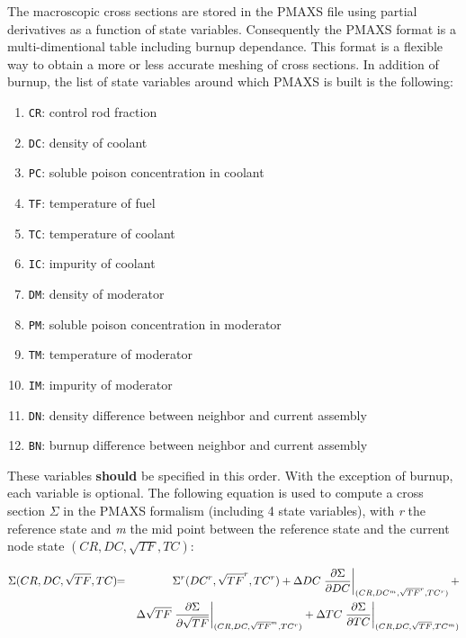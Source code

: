 \vskip 0.08cm

The macroscopic cross sections are stored in the PMAXS file using partial derivatives as a function of state variables. Consequently the PMAXS format is  a multi-dimentional table including burnup dependance. This format is a flexible way to obtain a more or less accurate meshing of cross sections. In addition of burnup, the list of state variables around which PMAXS is built is the following:

\begin{enumerate}
\item {\tt CR}: control rod fraction
\item {\tt DC}: density of coolant
\item {\tt PC}: soluble poison concentration in coolant
\item {\tt TF}: temperature of fuel
\item {\tt TC}: temperature of coolant
\item {\tt IC}: impurity of coolant
\item {\tt DM}: density of moderator
\item {\tt PM}: soluble poison concentration in moderator
\item {\tt TM}: temperature of moderator
\item {\tt IM}: impurity of moderator
\item {\tt DN}: density difference between neighbor and current assembly
\item {\tt BN}: burnup difference between neighbor and current assembly
\end{enumerate}

These variables \textbf{should} be specified in this order. With the exception of burnup, each variable is optional. The following equation is used to compute a cross section $\Sigma$ in the PMAXS formalism (including 4 state variables), with \textit{r} the reference state and  \textit{m} the mid point between the reference state and the current node state $( CR, DC,\sqrt{TF},TC )$:

\begin{eqnarray*}
\Sigma ( CR, DC,\sqrt{TF},TC )\negthinspace\negthinspace&=& \negthinspace\negthinspace\Sigma^{r} ( DC^{r},\sqrt{TF}^{r},TC^{r} ) +
\Delta DC
 \left. {\partial \Sigma\over \partial DC} \right|_{(CR, DC^{m} ,\sqrt{TF}^{r},TC^{r})} + 
 \\
&~&\Delta \sqrt{TF}
 \left. {\partial \Sigma\over \partial \sqrt{TF}} \right|_{(CR, DC ,\sqrt{TF}^{m},TC^{r})}+
  \Delta TC
 \left. {\partial \Sigma\over \partial TC} \right|_{(CR, DC ,\sqrt{TF},TC^{m})}
\label{Eq_partial}
\end{eqnarray*}

